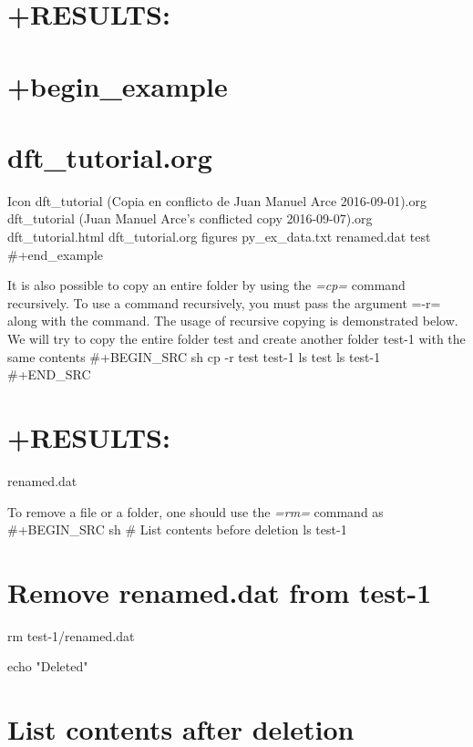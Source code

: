 \documentclass[11pt]{article}
\providecommand{\tightlist}{%
      \setlength{\itemsep}{0pt}\setlength{\parskip}{0pt}}
\begin{document}
\section{+RESULTS:}\label{results-1}

\section{+begin\_example}\label{begin_example}

\section{dft\_tutorial.org}\label{dft_tutorial.org}

Icon dft\_tutorial (Copia en conflicto de Juan Manuel Arce
2016-09-01).org dft\_tutorial (Juan Manuel Arce's conflicted copy
2016-09-07).org dft\_tutorial.html dft\_tutorial.org figures
py\_ex\_data.txt renamed.dat test \#+end\_example

It is also possible to copy an entire folder by using the \emph{=cp=}
command recursively. To use a command recursively, you must pass the
argument =-r= along with the command. The usage of recursive copying is
demonstrated below. We will try to copy the entire folder test and
create another folder test-1 with the same contents \#+BEGIN\_SRC sh cp
-r test test-1 ls test ls test-1 \#+END\_SRC

\section{+RESULTS:}\label{results-2}

\begin{description}
\tightlist
\item[: renamed.dat]
renamed.dat
\end{description}

To remove a file or a folder, one should use the \emph{=rm=} command as
\#+BEGIN\_SRC sh \# List contents before deletion ls test-1

\section{Remove renamed.dat from
test-1}\label{remove-renamed.dat-from-test-1}

rm test-1/renamed.dat

echo "Deleted"

\section{List contents after
deletion}\label{list-contents-after-deletion}
\end{document}
